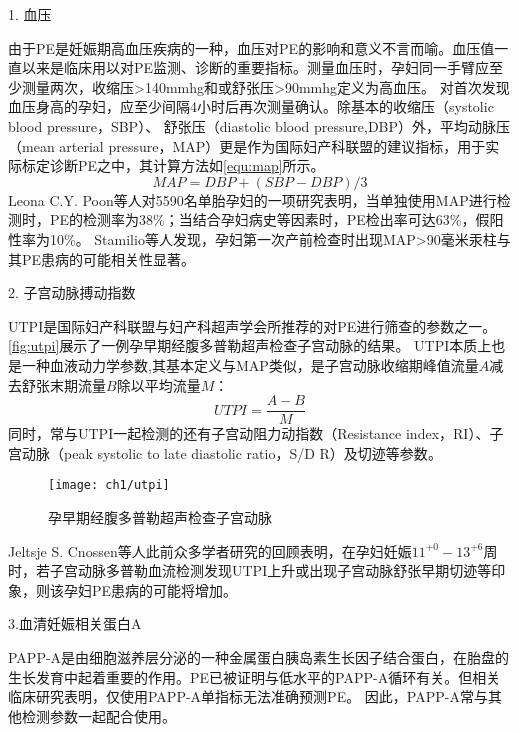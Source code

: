 1. 血压

由于PE是妊娠期高血压疾病的一种\cite{OAG9,HDASOM,2000s1}，血压对PE的影响和意义不言而喻。血压值一直以来是临床用以对PE监测、诊断的重要指标。测量血压时，孕妇同一手臂应至少测量两次，收缩压>140mmhg和或舒张压>90mmhg定义为高血压。
对首次发现血压身高的孕妇，应至少间隔4小时后再次测量确认\cite{OAG9}。除基本的收缩压（systolic blood pressure，SBP）、
舒张压（diastolic blood pressure,DBP）外，平均动脉压（mean arterial pressure，MAP）更是作为国际妇产科联盟的建议指标，用于实际标定诊断PE之中，其计算方法如\autoref{equ:map}所示\cite{FIGO}。
\begin{equation}
    \label{equ:map}
    MAP=DBP+(SBP-DBP)/3
\end{equation}
Leona C.Y. Poon\cite{Poon2008}等人对5590名单胎孕妇的一项研究表明，当单独使用MAP进行检测时，PE的检测率为38\%；当结合孕妇病史等因素时，PE检出率可达63\%，假阳性率为10\%。
Stamilio等人\cite{Stamilio2000}发现，孕妇第一次产前检查时出现MAP>90毫米汞柱与其PE患病的可能相关性显著。

2. 子宫动脉搏动指数

UTPI是国际妇产科联盟与妇产科超声学会所推荐的对PE进行筛查的参数之一\cite{FIGO,Sotiriadis2019}。\autoref{fig:utpi}展示了一例孕早期经腹多普勒超声检查子宫动脉的结果\cite{Sotiriadis2019}。
UTPI本质上也是一种血液动力学参数,其基本定义与MAP类似，是子宫动脉收缩期峰值流量$A$减去舒张末期流量$B$除以平均流量$M$\cite{Cnossen2008}：
\begin{equation}
    \label{equ:utpi}
    UTPI=\frac{A-B}{M}
\end{equation}
同时，常与UTPI一起检测的还有子宫动阻力动指数（Resistance index，RI）、子宫动脉（peak systolic to late diastolic ratio，S/D R）及切迹等参数\cite{Cnossen2008}。
\begin{figure}[htbp]
    \centering
    \texttt{[image: ch1/utpi]}
    \caption{\label{fig:utpi}孕早期经腹多普勒超声检查子宫动脉}
\end{figure}
Jeltsje S. Cnossen等人\cite{Cnossen2008}此前众多学者研究的回顾表明，在孕妇妊娠$11^{+0}-13^{+6}$周时，若子宫动脉多普勒血流检测发现UTPI上升或出现子宫动脉舒张早期切迹等印象，则该孕妇PE患病的可能将增加\cite{OAG9,Plasencia2008}。

3.血清妊娠相关蛋白A

PAPP-A是由细胞滋养层分泌的一种金属蛋白胰岛素生长因子结合蛋白，在胎盘的生长发育中起着重要的作用。PE已被证明与低水平的PAPP-A循环有关\cite{FIGO}。但相关临床研究表明，仅使用PAPP-A单指标无法准确预测PE\cite{Smith2002}。
因此，PAPP-A常与其他检测参数一起配合使用\cite{Poon2009,Tan2018,Ray2018}。 


